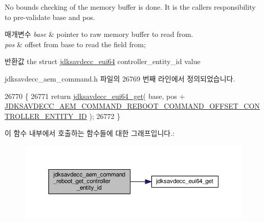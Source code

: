 No bounds checking of the memory buffer is done. It is the caller\textquotesingle{}s responsibility to pre-\/validate base and pos.


\begin{DoxyParams}{매개변수}
{\em base} & pointer to raw memory buffer to read from. \\
\hline
{\em pos} & offset from base to read the field from; \\
\hline
\end{DoxyParams}
\begin{DoxyReturn}{반환값}
the struct \hyperlink{structjdksavdecc__eui64}{jdksavdecc\+\_\+eui64} controller\+\_\+entity\+\_\+id value 
\end{DoxyReturn}


jdksavdecc\+\_\+aem\+\_\+command.\+h 파일의 26769 번째 라인에서 정의되었습니다.


\begin{DoxyCode}
26770 \{
26771     \textcolor{keywordflow}{return} \hyperlink{group__eui64_ga2652311a25a6b91cddbed75c108c7031}{jdksavdecc\_eui64\_get}( base, pos + 
      \hyperlink{group__command__reboot_gadab4c888de0be05f0397e84f99570994}{JDKSAVDECC\_AEM\_COMMAND\_REBOOT\_COMMAND\_OFFSET\_CONTROLLER\_ENTITY\_ID}
       );
26772 \}
\end{DoxyCode}


이 함수 내부에서 호출하는 함수들에 대한 그래프입니다.\+:
\nopagebreak
\begin{figure}[H]
\begin{center}
\leavevmode
\includegraphics[width=350pt]{group__command__reboot_ga1890ea4a161197f930ec73dfdc9cb61a_cgraph}
\end{center}
\end{figure}


